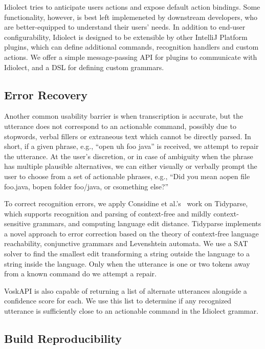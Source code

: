 \documentclass[conference]{IEEEtran}
\begin{document}
Idiolect tries to anticipate users actions and expose default action bindings. Some functionality, however, is best left implemeneted by downstream developers, who are better-equipped to understand their users' needs. In addition to end-user configurability, Idiolect is designed to be extensible by other IntelliJ Platform plugins, which can define additional commands, recognition handlers and custom actions. We offer a simple message-passing API for plugins to communicate with Idiolect, and a DSL for defining custom grammars.

\subsection{Error Recovery}\label{sec:error}

Another common usability barrier is when transcription is accurate, but the utterance does not correspond to an actionable command, possibly due to stopwords, verbal fillers or extraneous text which cannot be directly parsed. In short, if a given phrase, e.g., ``open uh foo java'' is received, we attempt to repair the utterance. At the user's discretion, or in case of ambiguity when the phrase has multiple plausible alternatives, we can either visually or verbally prompt the user to choose from a set of actionable phrases, e.g., ``Did you mean \textlangle a\textrangle open file foo.java, \textlangle b\textrangle open folder foo/java, or \textlangle c\textrangle something else?''

To correct recognition errors, we apply Considine et al.'s~\cite{considine2022tidyparse} work on Tidyparse, which supports recognition and parsing of context-free and mildly context-sensitive grammars, and computing language edit distance. Tidyparse implements a novel approach to error correction based on the theory of context-free language reachability, conjunctive grammars and Levenshtein automata. We use a SAT solver to find the smallest edit transforming a string outside the language to a string inside the language. Only when the utterance is one or two tokens away from a known command do we attempt a repair.

VoskAPI is also capable of returning a list of alternate utterances alongside a confidence score for each. We use this list to determine if any recognized utterance is sufficiently close to an actionable command in the Idiolect grammar.

\subsection{Build Reproducibility}
\end{document}
